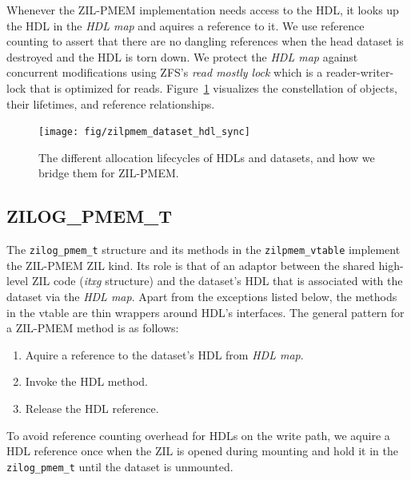 \documentclass[12pt,a4paper,twoside]{book}
\begin{document}
Whenever the ZIL-PMEM implementation needs access to the HDL, it looks up the HDL in the \textit{HDL map} and aquires a reference to it.
We use reference counting to assert that there are no dangling references when the head dataset is destroyed and the HDL is torn down.
We protect the \textit{HDL map} against concurrent modifications using ZFS's \textit{read mostly lock} which is a reader-writer-lock that is optimized for reads.
Figure~\ref{fig:zilpmem:datasethdlsync} visualizes the constellation of objects, their lifetimes, and reference relationships.

\begin{figure}[H]
    \centering
    \texttt{[image: fig/zilpmem\_dataset\_hdl\_sync]}
    \caption{The different allocation lifecycles of HDLs and datasets, and how we bridge them for ZIL-PMEM.}
    \label{fig:zilpmem:datasethdlsync}
\end{figure}

\subsection{ZILOG\_PMEM\_T}\label{sec:zilpmem:zilog}
The \lstinline{zilog_pmem_t} structure and its methods in the \lstinline{zilpmem_vtable} implement the ZIL-PMEM ZIL kind.
Its role is that of an adaptor between the shared high-level ZIL code (\textit{itxg} structure) and the dataset's HDL that is associated with the dataset via the \textit{HDL map}.
Apart from the exceptions listed below, the methods in the vtable are thin wrappers around HDL's interfaces.
The general pattern for a ZIL-PMEM method is as follows:
\begin{enumerate}[noitemsep]
    \item Aquire a reference to the dataset's HDL from \textit{HDL map}.
    \item Invoke the HDL method.
    \item Release the HDL reference.
\end{enumerate}
To avoid reference counting overhead for HDLs on the write path, we aquire a HDL reference once when the ZIL is opened during mounting and hold it in the \lstinline{zilog_pmem_t} until the dataset is unmounted.
\end{document}
